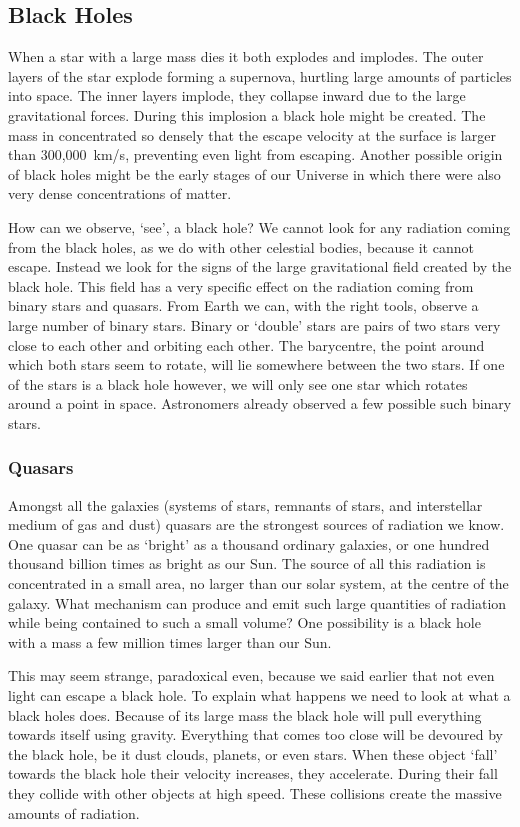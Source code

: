 \subsection{Black Holes}
When a star with a large mass dies it both explodes and implodes. The outer layers of the star explode forming a supernova, hurtling large amounts of particles into space. The inner layers implode, they collapse inward due to the large gravitational forces. During this implosion a black hole might be created. The mass in concentrated so densely that the escape velocity at the surface is larger than 300,000~km/s, preventing even light from escaping. Another possible origin of black holes might be the early stages of our Universe in which there were also very dense concentrations of matter.

How can we observe, `see', a black hole? We cannot look for any radiation coming from the black holes, as we do with other celestial bodies, because it cannot escape. Instead we look for the signs of the large gravitational field created by the black hole. This field has a very specific effect on the radiation coming from binary stars and quasars. From Earth we can, with the right tools, observe a large number of binary stars. Binary or `double' stars are pairs of two stars very close to each other and orbiting each other. The barycentre, the point around which both stars seem to rotate, will lie somewhere between the two stars. If one of the stars is a black hole however, we will only see one star which rotates around a point in space. Astronomers already observed a few possible such binary stars.

\subsubsection{Quasars}
Amongst all the galaxies (systems of stars, remnants of stars, and interstellar medium of gas and dust) quasars are the strongest sources of radiation we know. One quasar can be as `bright' as a thousand ordinary galaxies, or one hundred thousand billion times as bright as our Sun. The source of all this radiation is concentrated in a small area, no larger than our solar system, at the centre of the galaxy. What mechanism can produce and emit such large quantities of radiation while being contained to such a small volume? One possibility is a black hole with a mass a few million times larger than our Sun.

This may seem strange, paradoxical even, because we said earlier that not even light can escape a black hole. To explain what happens we need to look at what a black holes does. Because of its large mass the black hole will pull everything towards itself using gravity. Everything that comes too close will be devoured by the black hole, be it dust clouds, planets, or even stars. When these object `fall' towards the black hole their velocity increases, they accelerate. During their fall they collide with other objects at high speed. These collisions create the massive amounts of radiation.


